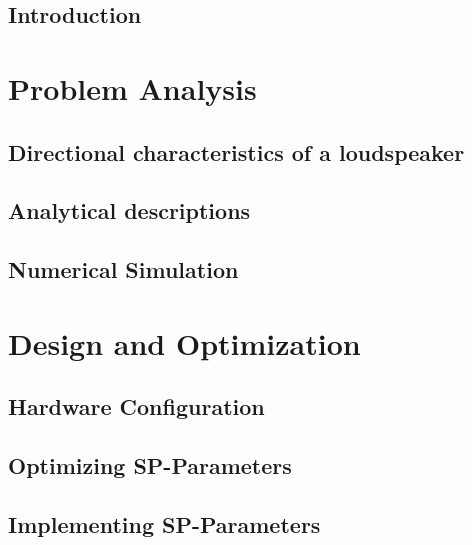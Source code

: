 \glsresetall
 \graphicspath{{figures/analysing/}}
\chapter{Introduction}\label{ch:intro}

\part{Problem Analysis}\label{pt:analysis} \glsresetall
 \graphicspath{{figures/analysing/}}
	\chapter{Directional characteristics of a loudspeaker}\label{ch:directional}
		
		
	\chapter{Analytical descriptions}\label{ch:analytical}
		
		
		
		
	\chapter{Numerical Simulation}\label{ch:numerical} 
	  
	



\part{Design and Optimization}\label{pt:design} 
\graphicspath{{figures/design/}}
	\chapter{Hardware Configuration}
	\chapter{Optimizing SP-Parameters}\label{ch:optimization}
		 
	\chapter{Implementing SP-Parameters}


